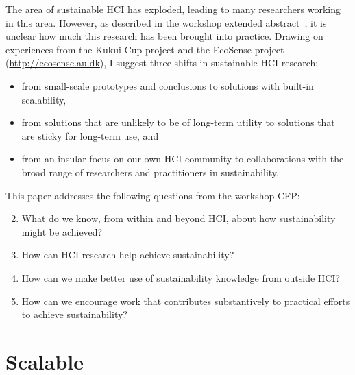\documentclass{sigchi}
\begin{document}
The area of sustainable HCI has exploded, leading to many researchers working in this area. However, as described in the workshop extended abstract~\cite{2014Silberman-CHIworkshop}, it is unclear how much this research has been brought into practice. Drawing on experiences from the Kukui Cup project \cite{csdl2-13-05,csdl2-12-08,csdl2-10-08} and the EcoSense project (\url{http://ecosense.au.dk}), I suggest three shifts in sustainable HCI research:
\begin{itemize}
	\item from small-scale prototypes and conclusions to solutions with built-in scalability,
	\item from solutions that are unlikely to be of long-term utility to solutions that are sticky for long-term use, and
	\item from an insular focus on our own HCI community to collaborations with the broad range of researchers and practitioners in sustainability.
\end{itemize}

This paper addresses the following questions from the workshop CFP:
\begin{enumerate}
  \setcounter{enumi}{1}
  \item What do we know, from within and beyond HCI, about how sustainability might be achieved?
  \setcounter{enumi}{3}
  \item How can HCI research help achieve sustainability?
  \setcounter{enumi}{6}
  \item How can we make better use of sustainability knowledge from outside HCI?
  \setcounter{enumi}{7}
  \item How can we encourage work that contributes substantively to practical efforts to achieve sustainability?
\end{enumerate}


\section{Scalable}

\end{document}
